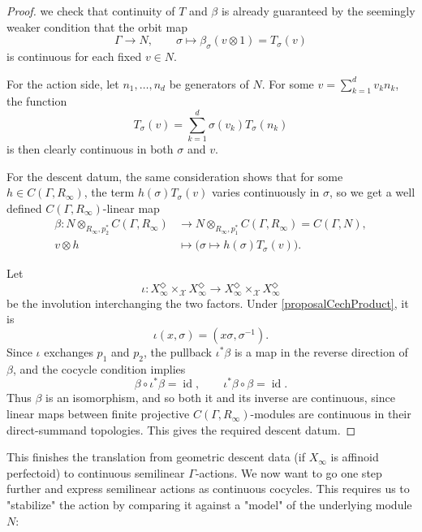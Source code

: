 \documentclass[10pt,twoside]{article}
\numberwithin{equation}{section}
\theoremstyle{plain}
\theoremstyle{definition}
\DeclareMathOperator{\id}{id}
\newcommand{\MCX}{\mathcal{X}}
\let \diamond \Diamond
\begin{document}
\begin{proof}
we check that continuity of \(T\) and \(\beta\) is already guaranteed by the seemingly weaker condition that the orbit map
\[
\Gamma\longrightarrow N,\qquad \sigma\longmapsto\beta_\sigma(v\otimes1)=T_\sigma(v)
\]
is continuous for each fixed \(v\in N\).

For the action side, let \(n_1,\ldots,n_d\) be generators of \(N\). For some \(v= \sum_{k=1}^d v_kn_k\), the function
\[
T_\sigma(v)=\sum_{k=1}^d\sigma(v_k)T_\sigma(n_k)
\]
is then clearly continuous in both \(\sigma\) and \(v\).\par

For the descent datum, the same consideration shows that for some \(h\in C(\Gamma, R_\infty)\), the term \(h(\sigma)T_\sigma(v)\) varies continuously in \(\sigma\), so we get a well defined \(C(\Gamma,R_\infty)\)-linear map
\begin{align*}
\beta\colon N\otimes_{R_\infty,p_2^*}C(\Gamma,R_\infty)&\longrightarrow
N\otimes_{R_\infty,p_1^*}C(\Gamma,R_\infty)=C(\Gamma,N),\\
v\otimes h&\longmapsto
\bigl(\sigma\mapsto h(\sigma)T_\sigma(v)\bigr).
\end{align*}

Let 
\[\iota\colon X_\infty^\diamond\times_\MCX X_\infty^\diamond\longrightarrow X_\infty^\diamond\times_\MCX X_\infty^\diamond\] be the involution interchanging the two factors. Under \eqref{proposalCechProduct}, it is
\[
\iota(x,\sigma)=(x\sigma,\sigma^{-1}).
\]
Since \(\iota\) exchanges \(p_1\) and \(p_2\), the pullback \(\iota^*\beta\) is a map in the reverse direction of \(\beta\), and the cocycle condition implies 
\[
\beta\circ\iota^*\beta=\id,\qquad
\iota^*\beta\circ\beta=\id.
\]
Thus \(\beta\) is an isomorphism, and so both it and its inverse are continuous, since linear maps between finite projective \(C(\Gamma,R_\infty)\)-modules are continuous in their direct-summand topologies. This gives the required descent datum.
\end{proof}

This finishes the translation from geometric descent data (if \(X_\infty\) is affinoid perfectoid) to continuous semilinear \(\Gamma\)-actions. We now want to go one step further and express semilinear actions as continuous cocycles. This requires us to "stabilize" the action by comparing it against a "model" of the underlying module \(N\):
\end{document}
